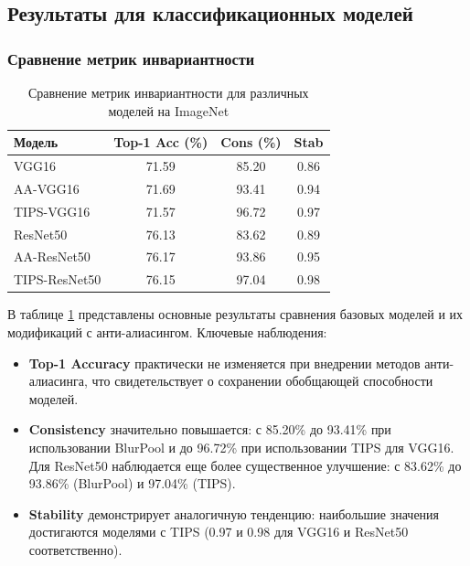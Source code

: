 \subsection{Результаты для классификационных моделей}
\label{sec:experiments:classification}

\subsubsection{Сравнение метрик инвариантности}
\label{sec:experiments:classification:metrics}

\begin{table}[ht]
\centering
\caption{Сравнение метрик инвариантности для различных моделей на ImageNet}
\label{tab:classification_metrics}
\begin{tabular}{|l|c|c|c|}
\hline
\textbf{Модель} & \textbf{Top-1 Acc (\%)} & \textbf{Cons (\%)} & \textbf{Stab} \\ \hline
VGG16 & 71.59 & 85.20 & 0.86 \\ \hline
AA-VGG16 & 71.69 & 93.41 & 0.94 \\ \hline
TIPS-VGG16 & 71.57 & 96.72 & 0.97 \\ \hline
ResNet50 & 76.13 & 83.62 & 0.89 \\ \hline
AA-ResNet50 & 76.17 & 93.86 & 0.95 \\ \hline
TIPS-ResNet50 & 76.15 & 97.04 & 0.98 \\ \hline
\end{tabular}
\end{table}

В таблице \ref{tab:classification_metrics} представлены основные результаты сравнения базовых моделей и их модификаций с анти-алиасингом. Ключевые наблюдения:

\begin{itemize}
    \item \textbf{Top-1 Accuracy} практически не изменяется при внедрении методов анти-алиасинга, что свидетельствует о сохранении обобщающей способности моделей.
    
    \item \textbf{Consistency} значительно повышается: с 85.20\% до 93.41\% при использовании BlurPool и до 96.72\% при использовании TIPS для VGG16. Для ResNet50 наблюдается еще более существенное улучшение: с 83.62\% до 93.86\% (BlurPool) и 97.04\% (TIPS).
    
    \item \textbf{Stability} демонстрирует аналогичную тенденцию: наибольшие значения достигаются моделями с TIPS (0.97 и 0.98 для VGG16 и ResNet50 соответственно).
\end{itemize}

